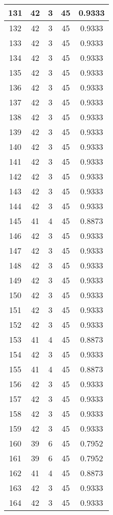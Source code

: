 \documentclass[letterpaper, 12pt]{article}
\begin{document}
\begin{longtable}{|c|c|c|c|c|}
\hline
131 & 42 & 3 & 45 & 0.9333 \\
\hline
132 & 42 & 3 & 45 & 0.9333 \\
\hline
133 & 42 & 3 & 45 & 0.9333 \\
\hline
134 & 42 & 3 & 45 & 0.9333 \\
\hline
135 & 42 & 3 & 45 & 0.9333 \\
\hline
136 & 42 & 3 & 45 & 0.9333 \\
\hline
137 & 42 & 3 & 45 & 0.9333 \\
\hline
138 & 42 & 3 & 45 & 0.9333 \\
\hline
139 & 42 & 3 & 45 & 0.9333 \\
\hline
140 & 42 & 3 & 45 & 0.9333 \\
\hline
141 & 42 & 3 & 45 & 0.9333 \\
\hline
142 & 42 & 3 & 45 & 0.9333 \\
\hline
143 & 42 & 3 & 45 & 0.9333 \\
\hline
144 & 42 & 3 & 45 & 0.9333 \\
\hline
145 & 41 & 4 & 45 & 0.8873 \\
\hline
146 & 42 & 3 & 45 & 0.9333 \\
\hline
147 & 42 & 3 & 45 & 0.9333 \\
\hline
148 & 42 & 3 & 45 & 0.9333 \\
\hline
149 & 42 & 3 & 45 & 0.9333 \\
\hline
150 & 42 & 3 & 45 & 0.9333 \\
\hline
151 & 42 & 3 & 45 & 0.9333 \\
\hline
152 & 42 & 3 & 45 & 0.9333 \\
\hline
153 & 41 & 4 & 45 & 0.8873 \\
\hline
154 & 42 & 3 & 45 & 0.9333 \\
\hline
155 & 41 & 4 & 45 & 0.8873 \\
\hline
156 & 42 & 3 & 45 & 0.9333 \\
\hline
157 & 42 & 3 & 45 & 0.9333 \\
\hline
158 & 42 & 3 & 45 & 0.9333 \\
\hline
159 & 42 & 3 & 45 & 0.9333 \\
\hline
160 & 39 & 6 & 45 & 0.7952 \\
\hline
161 & 39 & 6 & 45 & 0.7952 \\
\hline
162 & 41 & 4 & 45 & 0.8873 \\
\hline
163 & 42 & 3 & 45 & 0.9333 \\
\hline
164 & 42 & 3 & 45 & 0.9333 \\

\end{longtable}
\end{document}
